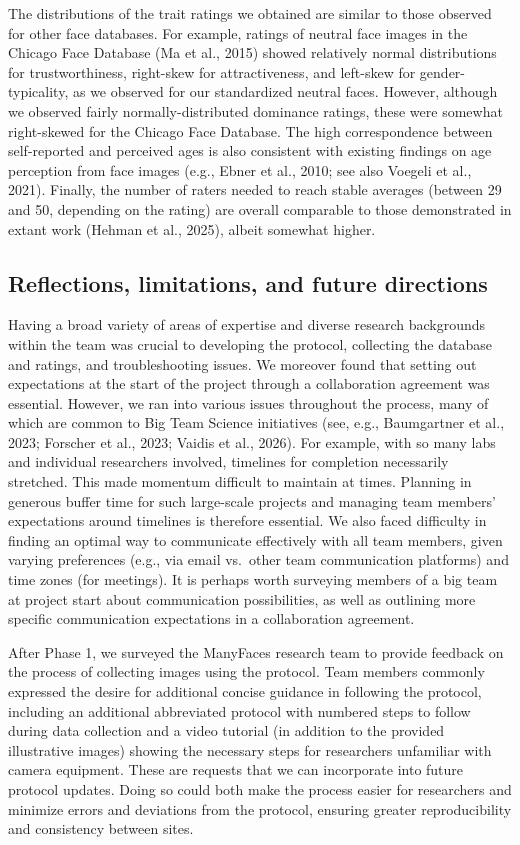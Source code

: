 \documentclass[
  letterpaper,
  DIV=11,
  numbers=noendperiod]{scrartcl}
\begin{document}
The distributions of the trait ratings we obtained are similar to those
observed for other face databases. For example, ratings of neutral face
images in the Chicago Face Database (Ma et al., 2015) showed relatively
normal distributions for trustworthiness, right-skew for attractiveness,
and left-skew for gender-typicality, as we observed for our standardized
neutral faces. However, although we observed fairly normally-distributed
dominance ratings, these were somewhat right-skewed for the Chicago Face
Database. The high correspondence between self-reported and perceived
ages is also consistent with existing findings on age perception from
face images (e.g., Ebner et al., 2010; see also Voegeli et al., 2021).
Finally, the number of raters needed to reach stable averages (between
29 and 50, depending on the rating) are overall comparable to those
demonstrated in extant work (Hehman et al., 2025), albeit somewhat
higher.

\subsection{Reflections, limitations, and future
directions}\label{reflections-limitations-and-future-directions}

Having a broad variety of areas of expertise and diverse research
backgrounds within the team was crucial to developing the protocol,
collecting the database and ratings, and troubleshooting issues. We
moreover found that setting out expectations at the start of the project
through a collaboration agreement was essential. However, we ran into
various issues throughout the process, many of which are common to Big
Team Science initiatives (see, e.g., Baumgartner et al., 2023; Forscher
et al., 2023; Vaidis et al., 2026). For example, with so many labs and
individual researchers involved, timelines for completion necessarily
stretched. This made momentum difficult to maintain at times. Planning
in generous buffer time for such large-scale projects and managing team
members' expectations around timelines is therefore essential. We also
faced difficulty in finding an optimal way to communicate effectively
with all team members, given varying preferences (e.g., via email
vs.~other team communication platforms) and time zones (for meetings).
It is perhaps worth surveying members of a big team at project start
about communication possibilities, as well as outlining more specific
communication expectations in a collaboration agreement.

After Phase 1, we surveyed the ManyFaces research team to provide
feedback on the process of collecting images using the protocol. Team
members commonly expressed the desire for additional concise guidance in
following the protocol, including an additional abbreviated protocol
with numbered steps to follow during data collection and a video
tutorial (in addition to the provided illustrative images) showing the
necessary steps for researchers unfamiliar with camera equipment. These
are requests that we can incorporate into future protocol updates. Doing
so could both make the process easier for researchers and minimize
errors and deviations from the protocol, ensuring greater
reproducibility and consistency between sites.
\end{document}
